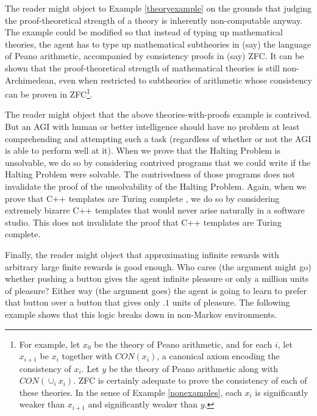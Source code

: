 \documentclass[twoside,11pt]{article}
\begin{document}
The reader might object to Example \ref{theoryexample} on the grounds that
judging the proof-theoretical
strength of a theory is inherently non-computable anyway. The example could be
modified so that instead of typing up mathematical theories, the agent has to
type up mathematical subtheories in (say) the language of Peano arithmetic,
accompanied by consistency proofs in (say) ZFC. It can be shown that the
proof-theoretical strength of mathematical theories is still non-Archimedean,
even when restricted to subtheories of arithmetic whose consistency can be
proven in ZFC\footnote{For example, let $x_0$ be the theory of Peano arithmetic,
and for each $i$, let $x_{i+1}$ be $x_i$ together with $CON(x_i)$, a canonical axiom
encoding the consistency of $x_i$. Let $y$ be the theory of Peano arithmetic
along with $CON(\cup_i x_i)$. ZFC is certainly adequate to prove the consistency of
each of these theories. In the sense of Example \ref{nonexamples}, each $x_{i}$ is
significantly weaker than $x_{i+1}$ and significantly weaker than $y$.}.

The reader might object that the above theories-with-proofs example is contrived.
But an AGI with human or better intelligence should have no problem
at least comprehending and attempting such a task (regardless of whether or not
the AGI is able to perform well at it). When we prove that the Halting Problem
is unsolvable, we do so by considering contrived programs that we could write if
the Halting Problem were solvable. The contrivedness of those programs does not
invalidate the proof of the unsolvability of the Halting Problem. Again, when we
prove that C++ templates are Turing complete \citep{veldhuizen}, we do so by
considering extremely
bizarre C++ templates that would never arise naturally in a software
studio. This does not invalidate the proof that C++ templates are Turing complete.

Finally, the reader might object that approximating infinite rewards with arbitrary
large finite rewards is good enough. Who cares (the argument might go) whether
pushing a button gives the agent infinite pleasure or only a million units of pleasure?
Either way (the argument goes) the agent is going to learn to prefer that button
over a button that gives only $.1$ units of pleasure. The following example shows
that this logic breaks down in non-Markov environments.
\end{document}
